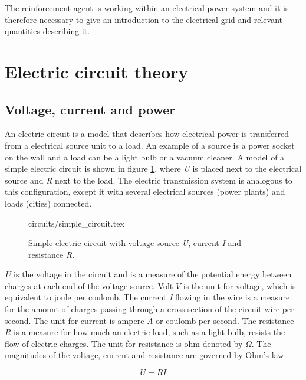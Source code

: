 \documentclass[class=book, crop=false]{standalone}
\begin{document}
The reinforcement agent is working within an electrical power system and it is therefore necessary to give an introduction to the electrical grid and relevant quantities describing it. 

\section{Electric circuit theory}
\subsection{Voltage, current and power}
An electric circuit is a model that describes how electrical power is transferred from a electrical source unit to a load. An example of a source is a power socket on the wall and a load can be a light bulb or a vacuum cleaner. A model of a simple electric circuit is shown in figure \ref{fig:theory:simple_circuit}, where \textit{U} is placed next to the electrical source and \textit{R} next to the load. The electric transmission system is analogous to this configuration, except it with several electrical sources (power plants) and loads (cities) connected. 

\begin{figure}[ht!]
    \centering
    {circuits/simple_circuit.tex}
    \caption{Simple electric circuit with voltage source \textit{U}, current \textit{I} and resistance \textit{R}.}
    \label{fig:theory:simple_circuit}
\end{figure}



\textit{U} is the voltage in the circuit and is a measure of the potential energy between charges at each end of the voltage source. Volt $V$ is the unit for voltage, which is equivalent to joule per coulomb. The current \textit{I} flowing in the wire is a measure for the amount of charges passing through a cross section of the circuit wire per second. The unit for current is ampere \textit{A} or coulomb per second. The resistance \textit{R} is a measure for how much an electric load, such as a light bulb, resists the flow of electric charges. The unit for resistance is ohm denoted by $\Omega$. The magnitudes of the voltage, current and resistance are governed by Ohm's law

\begin{equation}\label{eq:theory:ohm_simple}
    U = RI
\end{equation}
\end{document}
